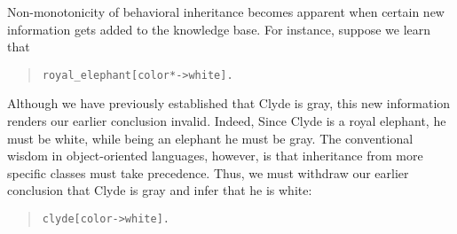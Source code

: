 \documentclass[11pt]{article}
\begin{document}
Non-monotonicity of behavioral inheritance becomes apparent when certain new
information gets added to the knowledge base. For instance, suppose we
learn that
\begin{quote}
\begin{verbatim}
royal_elephant[color*->white].  
\end{verbatim}
\end{quote}
Although we have previously established that {\sf Clyde} is gray, this
new information renders our earlier conclusion invalid. Indeed, Since
{\sf Clyde} is a royal elephant, he must be white, while being an
elephant he must be gray.  The conventional wisdom in object-oriented
languages, however, is that inheritance from more specific classes
must take precedence. Thus, we must withdraw our earlier conclusion
that {\sf Clyde} is gray and infer that he is white:
\begin{quote}
\begin{verbatim}
clyde[color->white].    
\end{verbatim}
\end{quote}
\end{document}
